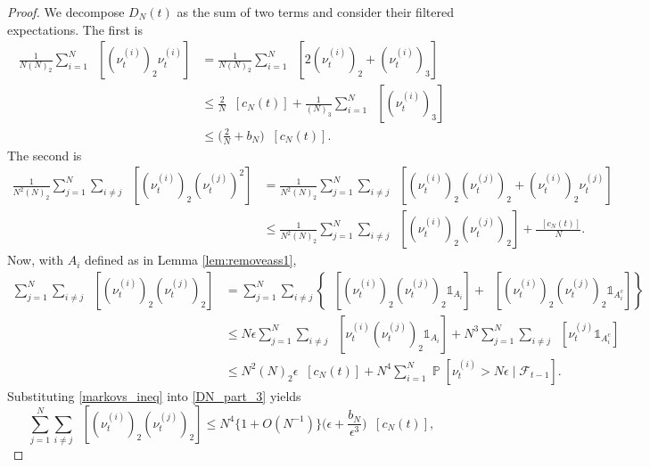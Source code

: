 \documentclass{article} %
\theoremstyle{definition}
\DeclareMathOperator{\Prob}{\mathbb{P}}
\DeclareMathOperator{\Et}{\mathbb{E}_t}
\newcommand{\1}[1]{\mathbbm{1}_{\{#1\}}}
\begin{document}
\begin{proof}
We decompose $D_N(t)$ as the sum of two terms and consider their filtered expectations. The first is
\begin{align}
\frac{ 1 }{ N ( N )_2 } \sum_{ i = 1 }^N \Et\left[ ( \nu_t^{(i)} )_2 \nu_t^{(i)}\right] &= \frac{ 1 }{ N ( N )_2 } \sum_{ i = 1 }^N \Et\left[ 2 ( \nu_t^{(i)} )_2 + ( \nu_t^{(i)} )_3 \right] \nonumber \\
&\leq \frac{ 2 }{ N } \Et[ c_N( t ) ] + \frac{ 1 }{ ( N )_3 } \sum_{ i = 1 }^N \Et\left[ ( \nu_t^{(i)} )_3 \right] \nonumber \\
&\leq \Bigg(\frac{ 2 }{ N } + b_N \Bigg) \Et[ c_N( t ) ]. \label{DN_part_1}
\end{align}
The second is
\begin{align}
\frac{ 1 }{ N^2 ( N )_2 } \sum_{ j=1 }^N \sum_{ i \neq j } \Et\left[ ( \nu_t^{(i)} )_2 ( \nu_t^{(j)} )^2 \right] &= \frac{ 1 }{ N^2 ( N )_2 } \sum_{ j=1 }^N \sum_{ i \neq j } \Et\left[ ( \nu_t^{(i)} )_2 ( \nu_t^{(j)} )_2 + ( \nu_t^{(i)} )_2 \nu_t^{(j)} \right] \nonumber \\
&\leq \frac{ 1 }{ N^2 ( N )_2 } \sum_{ j=1 }^N \sum_{ i \neq j } \Et\left[ ( \nu_t^{(i)} )_2 ( \nu_t^{(j)} )_2 \right] + \frac{ \Et[ c_N( t ) ] }{ N }. \label{DN_part_2}
\end{align}
Now, with $A_i$ defined as in Lemma \ref{lem:removeass1},
\begin{align}
\sum_{ j=1 }^N \sum_{ i \neq j } \Et\left[ ( \nu_t^{(i)} )_2 ( \nu_t^{(j)} )_2\right] &= \sum_{ j=1 }^N \sum_{ i \neq j } \left\{ \Et\left[ ( \nu_t^{(i)} )_2 ( \nu_t^{(j)} )_2 \mathds{ 1 }_{ A_i } \right] + \Et\left[ ( \nu_t^{(i)} )_2 ( \nu_t^{(j)} )_2 \mathds{ 1 }_{ A_i^c } \right] \right\} \nonumber \\
&\leq N \epsilon \sum_{ j=1 }^N \sum_{ i \neq j } \Et\left[ \nu_t^{(i)} ( \nu_t^{(j)} )_2 \mathds{ 1 }_{ A_i } \right] + N^3 \sum_{ j=1 }^N \sum_{ i \neq j } \Et\left[ \nu_t^{(j)} \mathds{ 1 }_{ A_i^c } \right] \nonumber \\
&\leq N^2 ( N )_2 \epsilon \Et[ c_N( t ) ] + N^4 \sum_{ i = 1 }^N \Prob\left[ \nu_t^{(i)} > N \epsilon \mid \mathcal{F}_{t-1} \right] . \label{DN_part_3}
\end{align}
Substituting \eqref{markovs_ineq} into \eqref{DN_part_3} yields
\begin{equation}
\sum_{ j=1 }^N \sum_{ i \neq j } \Et\left[ ( \nu_t^{(i)} )_2 ( \nu_t^{(j)} )_2 \right] \leq N^4 \{ 1 + O( N^{ -1 } ) \} \Bigg( \epsilon + \frac{ b_N }{ \epsilon^3 } \Bigg) \Et[ c_N( t ) ] , \label{DN_part_4}

\end{equation}
\end{proof}
\end{document}
